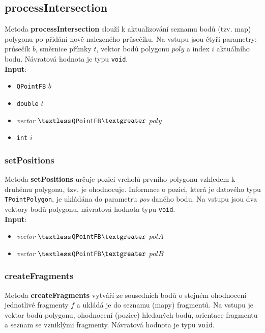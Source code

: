 \documentclass[a4paper, 12pt]{article}
\begin{document}
\subsection*{processIntersection}
Metoda \textbf{processIntersection} slouží k aktualizování seznamu bodů (tzv. map) polygonu po přidání nově nalezeného průsečíku. Na vstupu jsou čtyři parametry: průsečík $b$, směrnice přímky $t$, vektor bodů polygonu $poly$ a index $i$ aktuálního bodu. Návratová hodnota je typu \texttt{void}.\\

\textbf{Input}:
\begin{itemize}
\item \texttt{QPointFB} $b$
\item \texttt{double} $t$
\item \textsl{vector} $\textless$\texttt{QPointFB}$\textgreater$ $poly$
\item \texttt{int} $i$
\end{itemize}

\subsubsection*{setPositions}
Metoda \textbf{setPositions} určuje pozici vrcholů prvního polygonu vzhledem k druhému polygonu, tzv. je ohodnocuje. Informace o pozici, která je datového typu \texttt{TPointPolygon}, je ukládána do parametru \textit{pos} daného bodu. Na vstupu jsou dva vektory bodů polygonu, návratová hodnota typu \texttt{void}.\\

\textbf{Input}:
\begin{itemize}
\item \textsl{vector} $\textless$\texttt{QPointFB}$\textgreater$ $polA$
\item \textsl{vector} $\textless$\texttt{QPointFB}$\textgreater$ $polB$
\end{itemize}

\subsubsection*{createFragments}
Metoda \textbf{createFragments} vytváří ze sousedních bodů o stejném ohodnocení jednotlivé fragmenty $f$ a ukládá je do seznamu (mapy) fragmentů. Na vstupu je vektor bodů polygonu, ohodnocení (pozice) hledaných bodů, orientace fragmentu a seznam se vzniklými fragmenty. Návratová hodnota je typu \texttt{void}.\\
\end{document}
